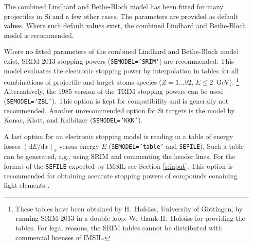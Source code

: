 The combined Lindhard and Bethe-Bloch model has been fitted for many 
projectiles in Si \cite{I0104} and a few other cases. The parameters are
provided as default values. Where such default values exist, the
combined Lindhard and Bethe-Bloch model is recommended.

Where no fitted parameters of the combined Lindhard and Bethe-Bloch model
exist, SRIM-2013 \cite{SRIM} stopping powers (\texttt{SEMODEL='SRIM'}) 
are recommended. This model evaluates the electronic stopping power by 
interpolation in tables for all combinations of projectile and target 
atoms species ($Z = 1 \ldots 92$, $E \le 2$~GeV).%
%
\footnote{These tables have been obtained by H.\ Hofsäss, University of 
Göttingen, by running SRIM-2013 in a double-loop. We thank H.\ Hofsäss 
for providing the tables. For legal reasons, the SRIM tables cannot be 
distributed with commercial licenses of IMSIL.}
%
Alternatively, the 1985 version of the TRIM stopping powers \cite{I8512} 
can be used (\texttt{SEMODEL='ZBL'}). This option is kept for compatibility
and is generally not recommended. Another unrecommended option for Si targets
is the model by Konac, Klatt, and Kalbitzer \cite{I9848} 
(\texttt{SEMODEL='KKK'}).

A last option for an electronic stopping model is reading in a table of 
energy losses $(\mathrm{d}E/\mathrm{d}x)_\mathrm{e}$ versus energy $E$ 
(\texttt{SEMODEL='table'} and \texttt{SEFILE}). Such a table can be generated,
e.g., using SRIM \cite{SRIM} and commenting the header lines. For the format 
of the \texttt{SEFILE} expected by IMSIL see Section \ref{s:input}. This option 
is recommended for obtaining accurate stopping powers of compounds conaining 
light elements \cite{ziegler_srim_2010}.


